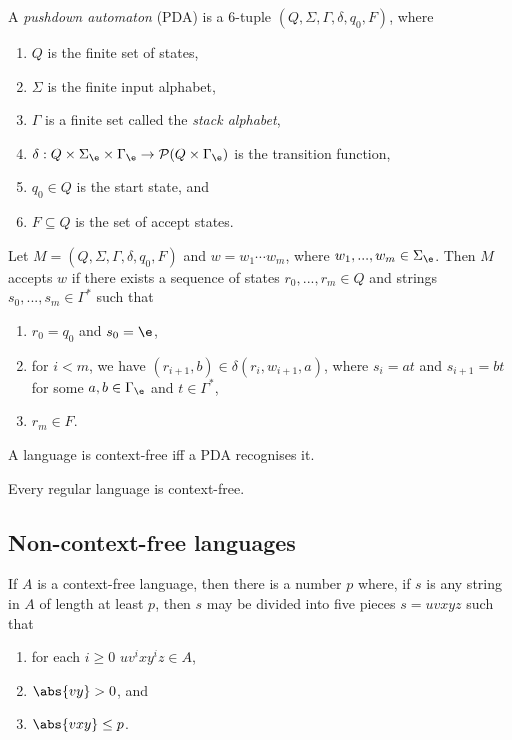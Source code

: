 \documentclass{article}
\begin{document}
\begin{definition*}
	A \emph{pushdown automaton} (PDA) is a 6-tuple $(Q,\Sigma,\Gamma,\delta,q_0,F)$,
	where
	\begin{enumerate}
		\item $Q$ is the finite set of states,
		\item $\Sigma$ is the finite input alphabet,
		\item $\Gamma$ is a finite set called the \emph{stack alphabet},
		\item $\delta:Q\times \Sigma_\e\times\Gamma_\e\to\mathcal{P}(Q\times\Gamma_\e)$ is the transition function,
		\item $q_0\in Q$ is the start state, and
		\item $F\subseteq Q$ is the set of accept states.
	\end{enumerate}
	Let $M=(Q,\Sigma,\Gamma,\delta,q_0,F)$ and $w=w_1\cdots w_m$, where
	$w_1,...,w_m\in\Sigma_\e$. Then $M$ accepts $w$ if there exists a sequence of
	states $r_0,...,r_m\in Q$ and strings $s_0,...,s_m\in\Gamma^*$ such that
	\begin{enumerate}
		\item $r_0=q_0$ and $s_0=\e$,
		\item for $i<m$, we have $(r_{i+1},b)\in\delta(r_i,w_{i+1},a)$, where $s_i=at$
		      and $s_{i+1}=bt$ for some $a,b\in\Gamma_\e$ and $t\in\Gamma^*$,
		\item $r_m\in F$.
	\end{enumerate}
\end{definition*}

\begin{theorem*}[Sipser p. 117]
	A language is context-free iff a PDA recognises it.
\end{theorem*}

\begin{corollary*}[Sipser p. 124]
	Every regular language is context-free.
\end{corollary*}

\subsection{Non-context-free languages}

\begin{theorem*}
	If $A$ is a context-free language, then there is a number $p$ where,
	if $s$ is any string in $A$ of length at least $p$, then $s$ may be
	divided into five pieces $s=uvxyz$ such that
	\begin{enumerate}
		\item for each $i\geq 0$ $uv^ixy^iz\in A$,
		\item $\abs{vy}>0$, and
		\item $\abs{vxy}\leq p$.
	\end{enumerate}
\end{theorem*}
\end{document}

